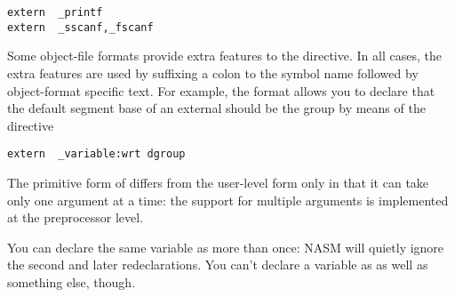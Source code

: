 \begin{lstlisting}
extern  _printf
extern  _sscanf,_fscanf
\end{lstlisting}

Some object-file formats provide extra features to the 
directive. In all cases, the extra features are used by suffixing a
colon to the symbol name followed by object-format specific text.
For example, the  format allows you to declare that the
default segment base of an external should be the group 
by means of the directive

\begin{lstlisting}
extern  _variable:wrt dgroup
\end{lstlisting}

The primitive form of  differs from the user-level form
only in that it can take only one argument at a time: the support
for multiple arguments is implemented at the preprocessor level.

You can declare the same variable as  more than once:
NASM will quietly ignore the second and later redeclarations.
You can't declare a variable as  as well as something
else, though.
